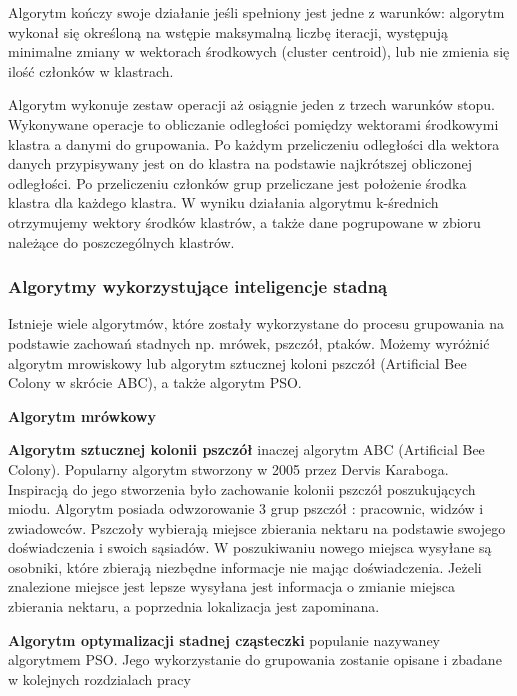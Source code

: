 \documentclass[twoside]{pracaMagisterskaMS}
\begin{document}
Algorytm kończy swoje działanie jeśli spełniony jest jedne z warunków: algorytm wykonał się określoną na wstępie maksymalną liczbę iteracji, występują minimalne zmiany w wektorach środkowych (cluster centroid), lub nie zmienia się ilość członków w klastrach.   

Algorytm wykonuje zestaw operacji aż osiągnie jeden z trzech warunków stopu. Wykonywane operacje to obliczanie odległości pomiędzy wektorami środkowymi klastra a danymi do grupowania. 
Po każdym przeliczeniu odległości dla wektora danych przypisywany jest on do klastra na podstawie najkrótszej obliczonej odległości. 
Po przeliczeniu członków grup przeliczane jest położenie środka klastra dla każdego klastra. W wyniku działania algorytmu k-średnich otrzymujemy wektory środków klastrów, a także dane pogrupowane w zbioru należące do poszczególnych klastrów.  


\subsubsection{Algorytmy wykorzystujące inteligencje stadną}
Istnieje wiele algorytmów, które zostały wykorzystane do procesu grupowania na podstawie zachowań stadnych np. mrówek, pszczół, ptaków. Możemy wyróżnić algorytm mrowiskowy lub algorytm sztucznej koloni pszczół (Artificial Bee Colony w skrócie ABC), a także algorytm PSO.

\textbf{Algorytm mrówkowy}  %


\textbf{Algorytm sztucznej kolonii pszczół} inaczej algorytm ABC (Artificial Bee Colony). Popularny algorytm stworzony w 2005 przez Dervis Karaboga. Inspiracją do jego stworzenia było zachowanie kolonii pszczół poszukujących miodu. Algorytm posiada odwzorowanie 3 grup pszczół : pracownic, widzów i zwiadowców. %
Pszczoły wybierają miejsce zbierania nektaru na podstawie swojego doświadczenia i swoich sąsiadów. W poszukiwaniu nowego miejsca wysyłane są osobniki, które zbierają niezbędne informacje nie mając doświadczenia. Jeżeli znalezione miejsce jest lepsze wysyłana jest informacja o zmianie miejsca zbierania nektaru, a poprzednia lokalizacja jest zapominana.

\textbf{Algorytm optymalizacji stadnej cząsteczki} populanie nazywaney algorytmem PSO. Jego wykorzystanie do grupowania zostanie opisane i zbadane w kolejnych rozdzialach pracy 

\end{document}
